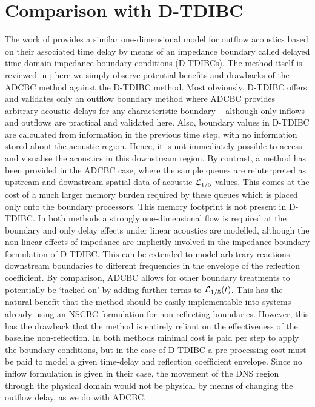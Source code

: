 \section{Comparison with D-TDIBC}

The work of \cite{douasbin2018DelayedtimeDomainImpedance} provides a similar one-dimensional model for outflow acoustics based on their associated time delay by means of an impedance boundary called delayed time-domain impedance boundary conditions (D-TDIBCs). The method itself is reviewed in ; here we simply observe potential benefits and drawbacks of the ADCBC method against the D-TDIBC method. Most obviously, D-TDIBC offers and validates only an outflow boundary method where ADCBC provides arbitrary acoustic delays for any characteristic boundary -- although only inflows and outflows are practical and validated here. Also, boundary values in D-TDIBC are calculated from information in the previous time step, with no information stored about the acoustic region. Hence, it is not immediately possible to access and visualise the acoustics in this downstream region. By contrast, a method has been provided in the ADCBC case, where the sample queues are reinterpreted as upstream and downstream spatial data of acoustic $\mathcal{L}_{1/5}$ values. This comes at the cost of a much larger memory burden required by these queues which is placed only onto the boundary processors. This memory footprint is not present in D-TDIBC. In both methods a strongly one-dimensional flow is required at the boundary and only delay effects under linear acoustics are modelled, although the non-linear effects of impedance are implicitly involved in the impedance boundary formulation of D-TDIBC. This can be extended to model arbitrary reactions downstream boundaries to different frequencies in the envelope of the reflection coefficient. By comparison, ADCBC allows for other boundary treatments to potentially be `tacked on' by adding further terms to $\mathcal{L}_{1/5}(t)$. This has the natural benefit that the method should be easily implementable into systems already using an NSCBC formulation for non-reflecting boundaries. However, this has the drawback that the method is entirely reliant on the effectiveness of the baseline non-reflection. In both methods minimal cost is paid per step to apply the boundary conditions, but in the case of D-TDIBC a pre-processing cost must be paid to model a given time-delay and reflection coefficient envelope. Since no inflow formulation is given in their case, the movement of the DNS region through the physical domain would not be physical by means of changing the outflow delay, as we do with ADCBC.




